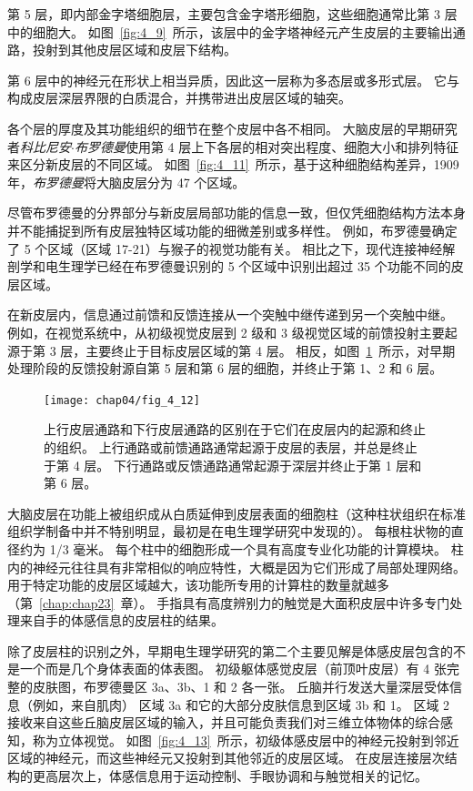 第 5 层，即内部金字塔细胞层，主要包含金字塔形细胞，这些细胞通常比第 3 层中的细胞大。
如图~\ref{fig:4_9}~所示，该层中的金字塔神经元产生皮层的主要输出通路，投射到其他皮层区域和皮层下结构。


第 6 层中的神经元在形状上相当异质，因此这一层称为多态层或多形式层。 
它与构成皮层深层界限的白质混合，并携带进出皮层区域的轴突。


各个层的厚度及其功能组织的细节在整个皮层中各不相同。 
大脑皮层的早期研究者\textit{科比尼安$\cdot$布罗德曼}使用第 4 层上下各层的相对突出程度、细胞大小和排列特征来区分新皮层的不同区域。 
如图~\ref{fig:4_11}~所示，基于这种细胞结构差异，1909 年，\textit{布罗德曼}将大脑皮层分为 47 个区域。


尽管布罗德曼的分界部分与新皮层局部功能的信息一致，但仅凭细胞结构方法本身并不能捕捉到所有皮层独特区域功能的细微差别或多样性。
例如，布罗德曼确定了 5 个区域（区域 17-21）与猴子的视觉功能有关。
相比之下，现代连接神经解剖学和电生理学已经在布罗德曼识别的 5 个区域中识别出超过 35 个功能不同的皮层区域。


在新皮层内，信息通过前馈和反馈连接从一个突触中继传递到另一个突触中继。 
例如，在视觉系统中，从初级视觉皮层到 2 级和 3 级视觉区域的前馈投射主要起源于第 3 层，主要终止于目标皮层区域的第 4 层。
相反，如图~\ref{fig:4_12}~所示，对早期处理阶段的反馈投射源自第 5 层和第 6 层的细胞，并终止于第 1、2 和 6 层。

\begin{figure}[htbp]
	\centering
	\texttt{[image: chap04/fig\_4\_12]}
	\caption{上行皮层通路和下行皮层通路的区别在于它们在皮层内的起源和终止的组织。
		上行通路或前馈通路通常起源于皮层的表层，并总是终止于第 4 层。
		下行通路或反馈通路通常起源于深层并终止于第 1 层和第 6 层\cite{felleman1991distributed}。}
	\label{fig:4_12}
\end{figure}


大脑皮层在功能上被组织成从白质延伸到皮层表面的细胞柱（这种柱状组织在标准组织学制备中并不特别明显，最初是在电生理学研究中发现的）。
每根柱状物的直径约为 1/3 毫米。
每个柱中的细胞形成一个具有高度专业化功能的计算模块。
柱内的神经元往往具有非常相似的响应特性，大概是因为它们形成了局部处理网络。 
用于特定功能的皮层区域越大，该功能所专用的计算柱的数量就越多（第~\ref{chap:chap23}~章）。 
手指具有高度辨别力的触觉是大面积皮层中许多专门处理来自手的体感信息的皮层柱的结果。


除了皮层柱的识别之外，早期电生理学研究的第二个主要见解是体感皮层包含的不是一个而是几个身体表面的体表图。
初级躯体感觉皮层（前顶叶皮层）有 4 张完整的皮肤图，布罗德曼区 3a、3b、1 和 2 各一张。
丘脑并行发送大量深层受体信息（例如，来自肌肉） 区域 3a 和它的大部分皮肤信息到区域 3b 和 1。
区域 2 接收来自这些丘脑皮层区域的输入，并且可能负责我们对三维立体物体的综合感知，称为立体视觉。
如图~\ref{fig:4_13}~所示，初级体感皮层中的神经元投射到邻近区域的神经元，而这些神经元又投射到其他邻近的皮层区域。
在皮层连接层次结构的更高层次上，体感信息用于运动控制、手眼协调和与触觉相关的记忆。


